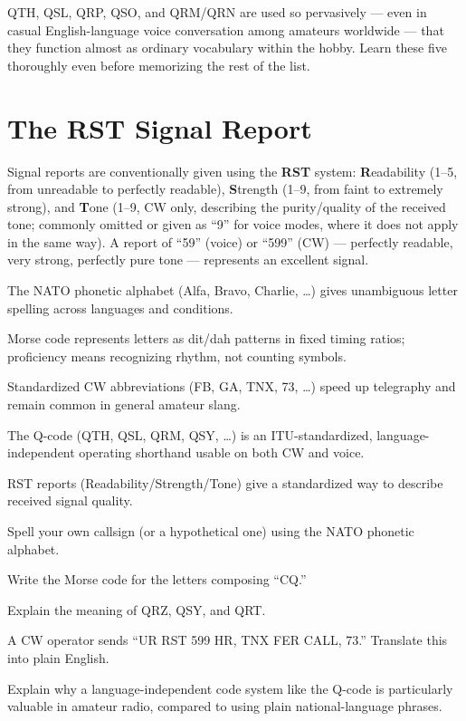 \begin{examtip}
QTH, QSL, QRP, QSO, and QRM/QRN are used so pervasively --- even in
casual English-language voice conversation among amateurs worldwide ---
that they function almost as ordinary vocabulary within the hobby. Learn
these five thoroughly even before memorizing the rest of the list.
\end{examtip}

\section{The RST Signal Report}

Signal reports are conventionally given using the \textbf{RST} system:
\textbf{R}eadability (1--5, from unreadable to perfectly readable),
\textbf{S}trength (1--9, from faint to extremely strong), and
\textbf{T}one (1--9, CW only, describing the purity/quality of the
received tone; commonly omitted or given as ``9'' for voice modes,
where it does not apply in the same way). A report of ``59'' (voice) or
``599'' (CW) --- perfectly readable, very strong, perfectly pure tone
--- represents an excellent signal.

\begin{quickreview}
\item The NATO phonetic alphabet (Alfa, Bravo, Charlie, \dots) gives
unambiguous letter spelling across languages and conditions.
\item Morse code represents letters as dit/dah patterns in fixed
timing ratios; proficiency means recognizing rhythm, not counting
symbols.
\item Standardized CW abbreviations (FB, GA, TNX, 73, \dots) speed up
telegraphy and remain common in general amateur slang.
\item The Q-code (QTH, QSL, QRM, QSY, \dots) is an ITU-standardized,
language-independent operating shorthand usable on both CW and voice.
\item RST reports (Readability/Strength/Tone) give a standardized way
to describe received signal quality.
\end{quickreview}

\begin{practiceproblems}
\item Spell your own callsign (or a hypothetical one) using the NATO
phonetic alphabet.
\item Write the Morse code for the letters composing ``CQ.''
\item Explain the meaning of QRZ, QSY, and QRT.
\item A CW operator sends ``UR RST 599 HR, TNX FER CALL, 73.''
Translate this into plain English.
\item Explain why a language-independent code system like the Q-code is
particularly valuable in amateur radio, compared to using plain
national-language phrases.
\end{practiceproblems}
